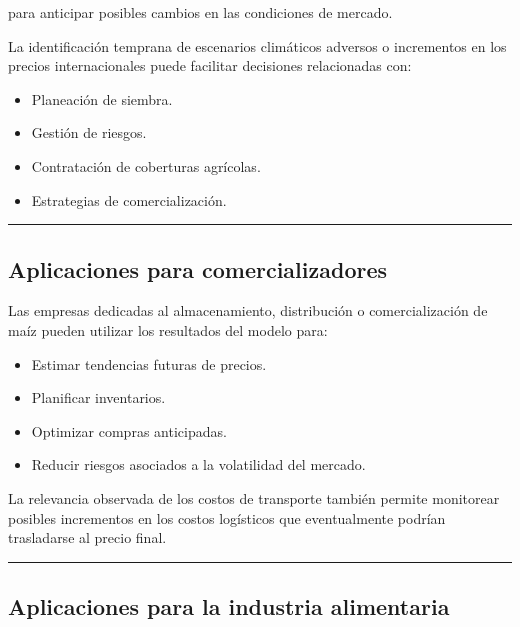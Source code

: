 \documentclass[11pt]{article}
\providecommand{\tightlist}{%
      \setlength{\itemsep}{0pt}\setlength{\parskip}{0pt}}
\begin{document}
para anticipar posibles cambios en las condiciones de mercado.

La identificación temprana de escenarios climáticos adversos o
incrementos en los precios internacionales puede facilitar decisiones
relacionadas con:

\begin{itemize}
\tightlist
\item
  Planeación de siembra.
\item
  Gestión de riesgos.
\item
  Contratación de coberturas agrícolas.
\item
  Estrategias de comercialización.
\end{itemize}

\begin{center}\rule{0.5\linewidth}{0.5pt}\end{center}

\hypertarget{aplicaciones-para-comercializadores}{%
\subsection{Aplicaciones para
comercializadores}\label{aplicaciones-para-comercializadores}}

Las empresas dedicadas al almacenamiento, distribución o
comercialización de maíz pueden utilizar los resultados del modelo para:

\begin{itemize}
\tightlist
\item
  Estimar tendencias futuras de precios.
\item
  Planificar inventarios.
\item
  Optimizar compras anticipadas.
\item
  Reducir riesgos asociados a la volatilidad del mercado.
\end{itemize}

La relevancia observada de los costos de transporte también permite
monitorear posibles incrementos en los costos logísticos que
eventualmente podrían trasladarse al precio final.

\begin{center}\rule{0.5\linewidth}{0.5pt}\end{center}

\hypertarget{aplicaciones-para-la-industria-alimentaria}{%
\subsection{Aplicaciones para la industria
alimentaria}\label{aplicaciones-para-la-industria-alimentaria}}
\end{document}
